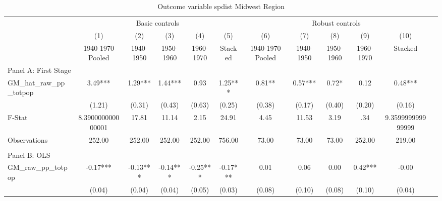  \begin{table}[htbp]\centering {} \begin{threeparttable} \caption{Outcome variable spdist Midwest Region} \begin{tabular}{l*{11}{c}} \toprule
          &\multicolumn{5}{c}{Basic controls}                                   &\multicolumn{5}{c}{Robust controls}                                  \\\cmidrule(lr){2-6}\cmidrule(lr){7-11}
          &\multicolumn{1}{c}{(1)}&\multicolumn{1}{c}{(2)}&\multicolumn{1}{c}{(3)}&\multicolumn{1}{c}{(4)}&\multicolumn{1}{c}{(5)}&\multicolumn{1}{c}{(6)}&\multicolumn{1}{c}{(7)}&\multicolumn{1}{c}{(8)}&\multicolumn{1}{c}{(9)}&\multicolumn{1}{c}{(10)}\\
          &\multicolumn{1}{c}{1940-1970 Pooled}&\multicolumn{1}{c}{1940-1950}&\multicolumn{1}{c}{1950-1960}&\multicolumn{1}{c}{1960-1970}&\multicolumn{1}{c}{Stacked}&\multicolumn{1}{c}{1940-1970 Pooled}&\multicolumn{1}{c}{1940-1950}&\multicolumn{1}{c}{1950-1960}&\multicolumn{1}{c}{1960-1970}&\multicolumn{1}{c}{Stacked}\\
\cmidrule(lr){1-11}
\multicolumn{10}{l}{Panel A: First Stage}\\
\cmidrule(lr){1-11}
GM\_hat\_raw\_pp\_totpop&      3.49***&      1.29***&      1.44***&      0.93   &      1.25***&      0.81** &      0.57***&      0.72*  &      0.12   &      0.48***\\
          &    (1.21)   &    (0.31)   &    (0.43)   &    (0.63)   &    (0.25)   &    (0.38)   &    (0.17)   &    (0.40)   &    (0.20)   &    (0.16)   \\
\midrule
F-Stat    &8.390000000000001   &     17.81   &     11.14   &      2.15   &     24.91   &      4.45   &     11.53   &      3.19   &       .34   &9.359999999999999   \\
Observations&    252.00   &    252.00   &    252.00   &    252.00   &    756.00   &     73.00   &     73.00   &     73.00   &    252.00   &    219.00   \\
\cmidrule[\heavyrulewidth](lr){1-11} \\ \cmidrule[\heavyrulewidth](lr){1-11}
\multicolumn{10}{l}{Panel B: OLS}\\
\cmidrule(lr){1-11}
GM\_raw\_pp\_totpop&     -0.17***&     -0.13***&     -0.14***&     -0.25***&     -0.17***&      0.01   &      0.06   &      0.00   &      0.42***&     -0.00   \\
          &    (0.04)   &    (0.04)   &    (0.04)   &    (0.05)   &    (0.03)   &    (0.08)   &    (0.10)   &    (0.08)   &    (0.10)   &    (0.04)   \\

\end{tabular}
\end{threeparttable}
\end{table}
